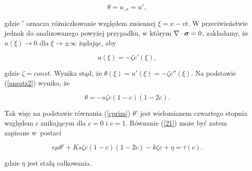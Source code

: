 \[ \theta = u_{,x} =u', \]

\noindent gdzie $'$ oznacza różniczkowanie względem zmiennej $\xi=x - vt$. W przeciwieństwie jednak do analizowanego powyżej przypadku, w którym $\nabla \cdot {\mbox{\boldmath$\sigma$}} = 0$, zakładamy, że $u(\xi) \to 0$ dla $\xi \to \pm \infty$ żądając, aby

\[ u(\xi) = -\zeta c'(\xi), \]

\noindent gdzie $\zeta = const$. Wynika stąd, że $\theta(\xi) = u'(\xi) = -\zeta c''(\xi)$. Na podstawie (\ref{ansatz2}) wynika, że 

\begin{equation} \label{t21} 
\theta = -s \zeta c(1-c)(1-2c). 
\end{equation} 

\noindent Tak więc na podstawie równania (\ref{cprim}) $\theta'$ jest wielomianem czwartego stopnia względem $c$ znikającym dla $c=0$ i $c=1$. Równanie (\ref{21}) może być zatem zapisane w~postaci 

\begin{equation} 
v \mu \theta' + K s \zeta c(1-c)(1-2c) - k \zeta c + \eta = \tau(c).
\end{equation}

\noindent gdzie $\eta$ jest stałą całkowania.